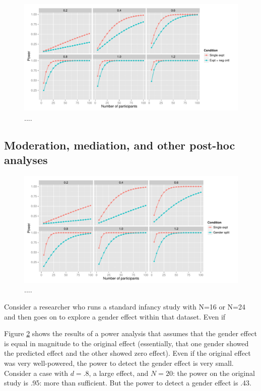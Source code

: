 \documentclass[man,noapacite]{apa2}
\begin{document}
\begin{figure}[t]
\centering
  \includegraphics[width=6.5in]{../plots/power_gap.pdf}
	\caption{\label{fig:powergap} .... }
\end{figure}

\subsection{Moderation, mediation, and other post-hoc analyses}

\begin{figure}[t]
\centering
  \includegraphics[width=6.5in]{../plots/post_hoc.pdf}
	\caption{\label{fig:gender} .... }
\end{figure}

Consider a researcher who runs a standard infancy study with N=16 or N=24 and then goes on to explore a gender effect within that dataset. Even if 

Figure \ref{fig:gender} shows the results of a power analysis that assumes that the gender effect is equal in magnitude to the original effect (essentially, that one gender showed the predicted effect and the other showed zero effect). Even if the original effect was very well-powered, the power to detect the gender effect is very small. Consider a case with $d=.8$, a large effect, and $N=20$: the power on the original study is .95: more than sufficient. But the power to detect a gender effect is .43. 
\end{document}
